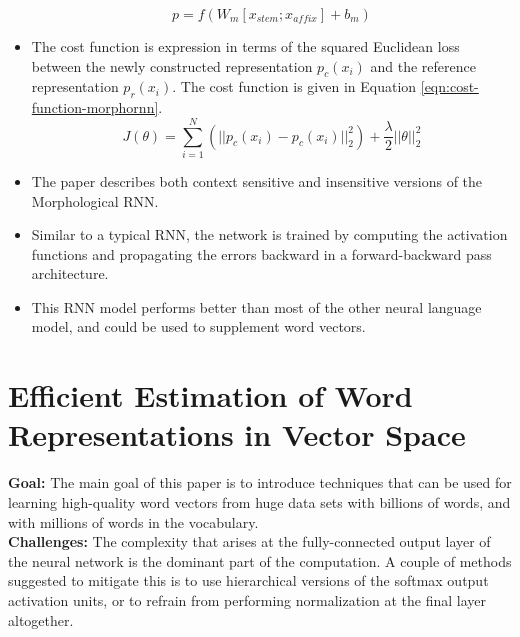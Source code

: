 \documentclass[11pt,a4paper]{article}
\begin{document}
\begin{itemize}
    \begin{equation} \label{eqn:parent-vector}
      p = f (W_m [x_{stem} ; x_{affix}] + b_m)
    \end{equation}
    \item
    The cost function is expression in terms of the squared Euclidean loss between the newly constructed representation $p_c(x_i)$ and the reference representation $p_r(x_i)$. The cost function is given in Equation \ref{eqn:cost-function-morphornn}.
    \begin{equation} \label{eqn:cost-function-morphornn}
      J(\theta) = \sum_{i=1}^N (|| p_c(x_i) - p_c(x_i) ||^2_2) + \frac{\lambda}{2} ||\theta||^2_2
    \end{equation}
    \item
    The paper describes both context sensitive and insensitive versions of the Morphological RNN.
    \item
    Similar to a typical RNN, the network is trained by computing the activation functions and propagating the errors backward in a forward-backward pass architecture.
    \item 
    This RNN model performs better than most of the other neural language model, and could be used to supplement word vectors.
  \end{itemize}



\section{Efficient Estimation of Word Representations in Vector Space} %
\label{sec:efficient_estimation_of_word_representations_in_vector_space}

  \textbf{Goal:}
  The main goal of this paper is to introduce techniques that can be used for learning high-quality word vectors from huge data sets with billions of words, and with millions of words in the vocabulary.\\

  \textbf{Challenges:}
  The complexity that arises at the fully-connected output layer of the neural network is the dominant part of the computation. A couple of methods suggested to mitigate this is to use hierarchical versions of the softmax output activation units, or to refrain from performing normalization at the final layer altogether.
\end{document}
